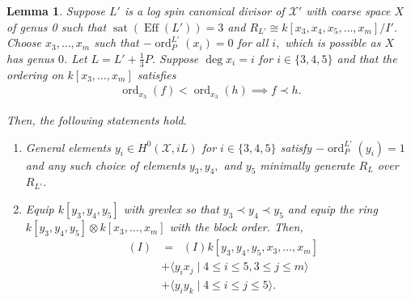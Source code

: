 \documentclass{amsart}
\theoremstyle{plain}
\newtheorem{lem}[thm]{Lemma}
\theoremstyle{definition}
\theoremstyle{remark}
\numberwithin{equation}{section}
\DeclareMathOperator{\ord}{ord}
\newcommand\sx{\mathscr X}
\newcommand{\halfcan}{L}
\DeclareMathOperator{\initial}{in_\prec}
\DeclareMathOperator{\Eff}{Eff}
\DeclareMathOperator{\sat}{sat}
\begin{document}
\begin{lem}
\label{lem:sat-3}
Suppose $\halfcan'$ is a log spin canonical divisor of $\sx'$ with coarse
space $X$ of genus 0 such that $\sat(\Eff(\halfcan')) = 3$ and $R_
{\halfcan'} \cong k[x_3, x_4 , x_5, \ldots, x_m]/I'$. Choose $x_3, \ldots, x_m$ such that $-\ord^{L'}_P(x_i)=0$ for all $i,$ which is possible as $X$ has genus $0$. Let $L = L' + \frac
{1}{3}P$. Suppose $\deg x_i = i$ for $i \in \{3, 4, 5\}$ and that
the ordering on $k[x_3, \ldots, x_m]$ satisfies
\begin{align*}
	\ord_{x_3}(f) < \ord_{x_3}(h) \implies f \prec h.
\end{align*}

\noindent
Then, the following statements hold.

\begin{enumerate}
	\item[(a)] General elements  $y_i \in H^0(\sx, iL)$ for $i \in \{3,
		4,5\}$ satisfy $-\ord_P^{\halfcan'}(y_i) = 1$ and any such choice of elements $y
		_3, y_4,$ and $y_5$ minimally generate $R_\halfcan$ over $R_{\halfcan'}$.
	\item[(b)] Equip $k[y_3, y_4, y_5]$ with grevlex so that $y_3 \prec 
		y_4 \prec y_5$
		and equip the ring $k[y_3, y_4, y_5] \otimes k[x_3, \ldots, x_m]$ with the block order.  Then,
		\begin{align*}
			\initial(I) &= \initial(I) k[y_3, y_4, y_5, x_3, \ldots, x_m] \\
			&+ \langle y_i x_j \mid 4 \leq i \leq 5, 3 \leq j \leq m\rangle \\
			&+ \langle y_i y_k \mid 4 \leq i \leq j \leq 5\rangle.
		\end{align*}
\end{enumerate}
\end{lem}
\end{document}

